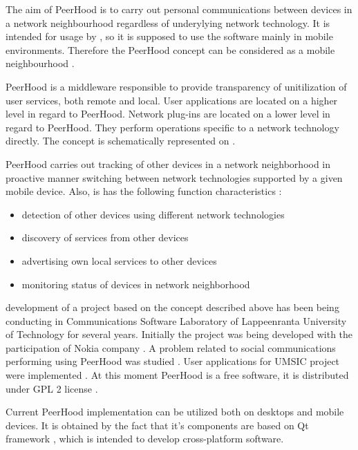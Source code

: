 %
The aim of PeerHood is to carry out personal communications between devices in a network neighbourhood regardless of underylying network technology. 
%
It is intended for usage by , so it is supposed to use the software mainly in mobile environments. 
%
Therefore the PeerHood concept can be considered as a mobile  neighbourhood . 

%
PeerHood is a middleware responsible to provide transparency of unitilization of user services, both remote and local. 
%
User applications are located on a higher level in regard to PeerHood. 
%
Network plug-ins are located on a lower level in regard to PeerHood. 
%
They perform operations specific to a network technology directly. 
%
The concept is schematically represented on . 


%
PeerHood carries out tracking of other devices in a network neighborhood in proactive manner switching between network technologies supported by a given mobile device. 
%
Also, is has the following function characteristics : 
\begin{itemize}
	\item detection of other devices using different network technologies
	\item discovery of services from other devices
	\item advertising own local services to other devices
	\item monitoring status of devices in network neighborhood
\end{itemize}

%
 development of a project based on the concept described above has been being conducting in Communications Software Laboratory of Lappeenranta University of Technology for several years. 
%
Initially the project was being developed with the participation of Nokia company . 
%
A problem related to social communications performing using PeerHood was studied . 
%
User applications for UMSIC project  were implemented . 
%
At this moment PeerHood is a free software, it is distributed under GPL 2 license  . 

%
Current PeerHood implementation can be utilized both on desktops and mobile devices. 
%
It is obtained by the fact that it's components are based on Qt framework , which is intended to develop \A cross-platform software. 
